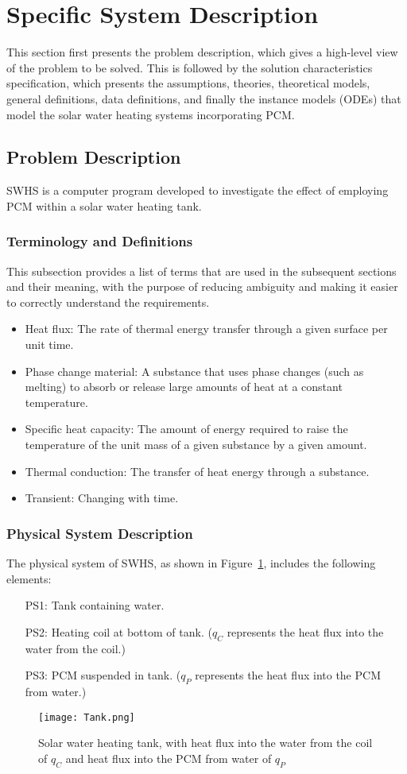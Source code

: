 \documentclass[12pt]{article}
\begin{document}
\section{Specific System Description}
\label{Sec:SpecSystDesc}
This section first presents the problem description, which gives a high-level view of the problem to be solved. This is followed by the solution characteristics specification, which presents the assumptions, theories, theoretical models, general definitions, data definitions, and finally the instance models (ODEs) that model the solar water heating systems incorporating PCM.
\subsection{Problem Description}
\label{Sec:ProbDesc}
SWHS is a computer program developed to investigate the effect of employing PCM within a solar water heating tank.
\subsubsection{Terminology and Definitions}
\label{Sec:TermDefs}
This subsection provides a list of terms that are used in the subsequent sections and their meaning, with the purpose of reducing ambiguity and making it easier to correctly understand the requirements.
\begin{itemize}
\item{Heat flux: The rate of thermal energy transfer through a given surface per unit time.}
\item{Phase change material: A substance that uses phase changes (such as melting) to absorb or release large amounts of heat at a constant temperature.}
\item{Specific heat capacity: The amount of energy required to raise the temperature of the unit mass of a given substance by a given amount.}
\item{Thermal conduction: The transfer of heat energy through a substance.}
\item{Transient: Changing with time.}
\end{itemize}
\subsubsection{Physical System Description}
\label{Sec:PhysSyst}
The physical system of SWHS, as shown in Figure~\ref{Figure:Tank}, includes the following elements:
\begin{itemize}
\item[PS1:]Tank containing water.
\item[PS2:]Heating coil at bottom of tank. (${q_{C}}$ represents the heat flux into the water from the coil.)
\item[PS3:]PCM suspended in tank. (${q_{P}}$ represents the heat flux into the PCM from water.)
\end{itemize}
\begin{figure}
\begin{center}
\texttt{[image: Tank.png]}
\caption{Solar water heating tank, with heat flux into the water from the coil of ${q_{C}}$ and heat flux into the PCM from water of ${q_{P}}$}
\label{Figure:Tank}
\end{center}
\end{figure}
\end{document}
